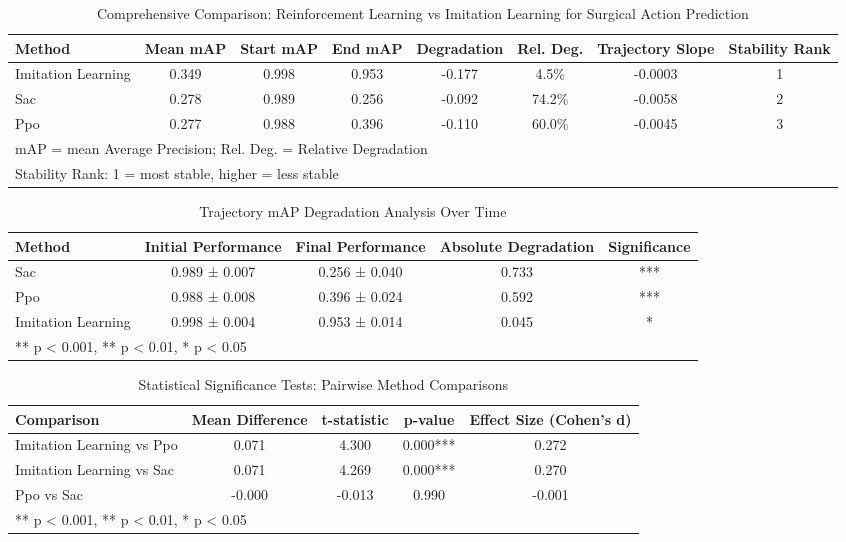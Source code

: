 
\begin{table*}[htbp]
\centering
\caption{Comprehensive Comparison: Reinforcement Learning vs Imitation Learning for Surgical Action Prediction}
\label{tab:main_results}
\begin{tabular}{lccccccc}
\toprule
Method & Mean mAP & Start mAP & End mAP & Degradation & Rel. Deg. & Trajectory Slope & Stability Rank \\
\midrule

Imitation Learning & 0.349 & 0.998 & 0.953 & -0.177 & 4.5\% & -0.0003 & 1 \\
Sac & 0.278 & 0.989 & 0.256 & -0.092 & 74.2\% & -0.0058 & 2 \\
Ppo & 0.277 & 0.988 & 0.396 & -0.110 & 60.0\% & -0.0045 & 3 \\

\bottomrule
\multicolumn{8}{l}{\footnotesize mAP = mean Average Precision; Rel. Deg. = Relative Degradation} \\
\multicolumn{8}{l}{\footnotesize Stability Rank: 1 = most stable, higher = less stable} \\
\end{tabular}
\end{table*}


\begin{table}[htbp]
\centering
\caption{Trajectory mAP Degradation Analysis Over Time}
\label{tab:map_degradation}
\begin{tabular}{lcccc}
\toprule
Method & Initial Performance & Final Performance & Absolute Degradation & Significance \\
\midrule

Sac & 0.989 ± 0.007 & 0.256 ± 0.040 & 0.733 & *** \\
Ppo & 0.988 ± 0.008 & 0.396 ± 0.024 & 0.592 & *** \\
Imitation Learning & 0.998 ± 0.004 & 0.953 ± 0.014 & 0.045 & * \\

\bottomrule
\multicolumn{5}{l}{\footnotesize *** p < 0.001, ** p < 0.01, * p < 0.05} \\
\end{tabular}
\end{table}


\begin{table}[htbp]
\centering
\caption{Statistical Significance Tests: Pairwise Method Comparisons}
\label{tab:statistical_tests}
\begin{tabular}{lcccc}
\toprule
Comparison & Mean Difference & t-statistic & p-value & Effect Size (Cohen's d) \\
\midrule

Imitation Learning vs Ppo & 0.071 & 4.300 & 0.000*** & 0.272 \\
Imitation Learning vs Sac & 0.071 & 4.269 & 0.000*** & 0.270 \\
Ppo vs Sac & -0.000 & -0.013 & 0.990 & -0.001 \\

\bottomrule
\multicolumn{5}{l}{\footnotesize *** p < 0.001, ** p < 0.01, * p < 0.05} \\
\end{tabular}
\end{table}


